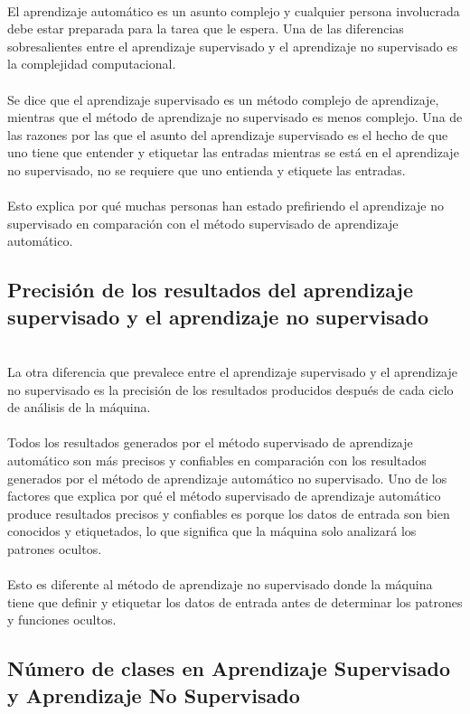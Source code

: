 \documentclass[11pt,a4paper]{article}
\begin{document}
		\\El aprendizaje automático es un asunto complejo y cualquier persona involucrada debe estar preparada para la tarea que le espera. Una de las diferencias sobresalientes entre el aprendizaje supervisado y el aprendizaje no supervisado es la complejidad computacional. \\
		\\Se dice que el aprendizaje supervisado es un método complejo de aprendizaje, mientras que el método de aprendizaje no supervisado es menos complejo. Una de las razones por las que el asunto del aprendizaje supervisado es el hecho de que uno tiene que entender y etiquetar las entradas mientras se está en el aprendizaje no supervisado, no se requiere que uno entienda y etiquete las entradas. \\
		\\Esto explica por qué muchas personas han estado prefiriendo el aprendizaje no supervisado en comparación con el método supervisado de aprendizaje automático.\\

        \subsection{Precisión de los resultados del aprendizaje supervisado y el aprendizaje no supervisado}
		
		\\La otra diferencia que prevalece entre el aprendizaje supervisado y el aprendizaje no supervisado es la precisión de los resultados producidos después de cada ciclo de análisis de la máquina. \\
		\\Todos los resultados generados por el método supervisado de aprendizaje automático son más precisos y confiables en comparación con los resultados generados por el método de aprendizaje automático no supervisado. Uno de los factores que explica por qué el método supervisado de aprendizaje automático produce resultados precisos y confiables es porque los datos de entrada son bien conocidos y etiquetados, lo que significa que la máquina solo analizará los patrones ocultos. \\
		\\Esto es diferente al método de aprendizaje no supervisado donde la máquina tiene que definir y etiquetar los datos de entrada antes de determinar los patrones y funciones ocultos.\\
		
		\subsection{Número de clases en Aprendizaje Supervisado y Aprendizaje No Supervisado}
		
\end{document}
